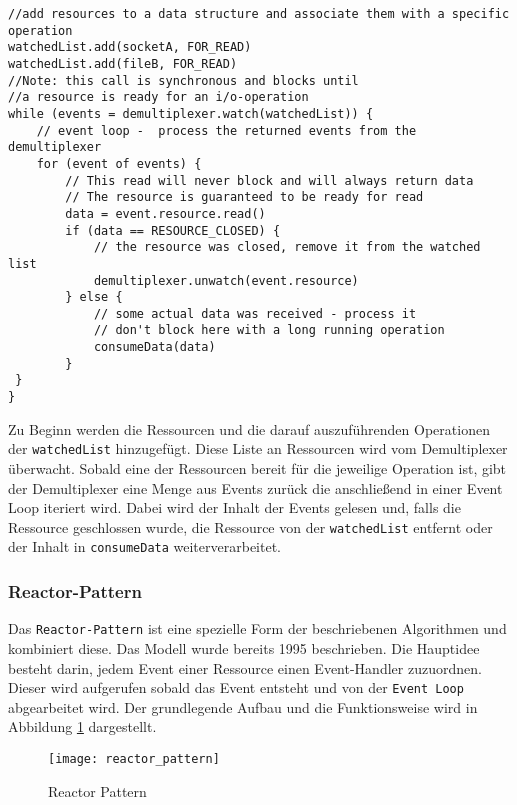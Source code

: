 \begin{lstlisting}[caption=Einfaches Pseudocode-Beispiel für Synchronous Event Demultiplexing mit Event Loop,
captionpos=b, label=lst:EventLoop_Pseudocode]
//add resources to a data structure and associate them with a specific operation
watchedList.add(socketA, FOR_READ)
watchedList.add(fileB, FOR_READ)
//Note: this call is synchronous and blocks until
//a resource is ready for an i/o-operation
while (events = demultiplexer.watch(watchedList)) {
	// event loop -  process the returned events from the demultiplexer
	for (event of events) {
		// This read will never block and will always return data
		// The resource is guaranteed to be ready for read
		data = event.resource.read()
		if (data == RESOURCE_CLOSED) {
			// the resource was closed, remove it from the watched list
			demultiplexer.unwatch(event.resource)
		} else {
			// some actual data was received - process it 
			// don't block here with a long running operation
			consumeData(data)
		}
 }
}
\end{lstlisting}
Zu Beginn werden die Ressourcen und die darauf auszuführenden Operationen der \verb|watchedList| hinzugefügt.
Diese Liste an Ressourcen wird vom Demultiplexer überwacht. Sobald eine der Ressourcen bereit
für die jeweilige Operation ist, gibt der Demultiplexer eine Menge aus Events zurück die anschließend in einer
Event Loop iteriert wird. Dabei wird der Inhalt der Events gelesen und, falls die Ressource
geschlossen wurde, die Ressource von der \verb|watchedList| entfernt oder der Inhalt in \verb|consumeData| weiterverarbeitet.
\parencite[Event Demultiplexing]{NodeJSDesignPatterns}

\newpage
\subsubsection{Reactor-Pattern}
\label{subsubsec:reactor_pattern}
Das \verb|Reactor-Pattern| ist eine spezielle Form der beschriebenen Algorithmen und kombiniert diese.
Das Modell wurde bereits 1995 beschrieben.\parencite{SchmidtReactorPattern}
Die Hauptidee besteht darin, jedem Event einer Ressource einen Event-Handler zuzuordnen.
Dieser wird aufgerufen sobald das Event entsteht und von der \verb|Event Loop| abgearbeitet wird.
Der grundlegende Aufbau und die Funktionsweise wird in Abbildung \ref{fig:reactor_pattern} dargestellt.
\begin{figure}[H]
  \centering
  \texttt{[image: reactor\_pattern]}
  \caption{Reactor Pattern \parencite[Abbildung 1.3]{NodeJSDesignPatterns}}
  \label{fig:reactor_pattern}
\end{figure}

